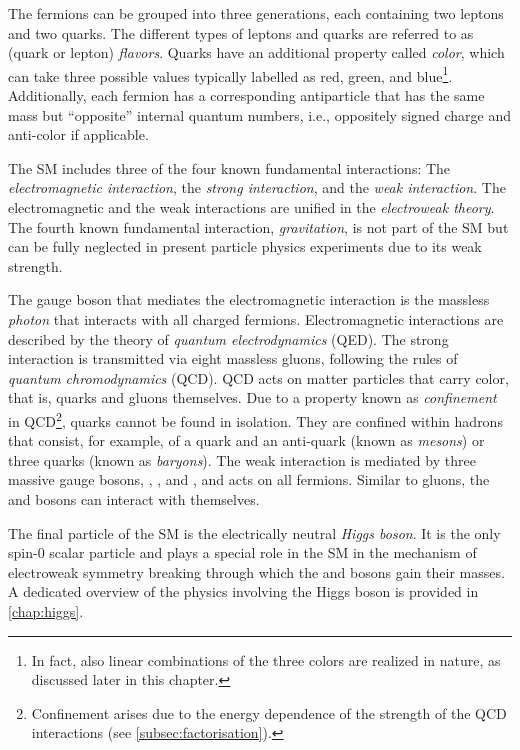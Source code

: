 The fermions can be grouped into three generations, each containing two leptons and two quarks. The different types of leptons and quarks are referred to as (quark or lepton) \emph{flavors}.
Quarks have an additional property called \emph{color}, which can take three possible values typically labelled as red, green, and blue\footnote{In fact, also linear combinations of the three colors are realized in nature, as discussed later in this chapter.}.
Additionally, each fermion has a corresponding antiparticle that has the same mass but ``opposite'' internal quantum numbers, i.e., oppositely signed charge and anti-color if applicable.

The SM includes three of the four known fundamental interactions: The \emph{electromagnetic interaction}, the \emph{strong interaction}, and the \emph{weak interaction}. The electromagnetic and the weak interactions are unified in the \emph{electroweak theory}. The fourth known fundamental interaction, \emph{gravitation}, is not part of the SM but can be fully neglected in present particle physics experiments due to its weak strength.

The gauge boson that mediates the electromagnetic interaction is the massless \emph{photon} that interacts with all charged fermions. Electromagnetic interactions are described by the theory of \emph{quantum electrodynamics} (QED). The strong interaction is transmitted via eight massless gluons, following the rules of \emph{quantum chromodynamics} (QCD). QCD acts on matter particles that carry color, that is, quarks and gluons themselves. 
Due to a property known as \emph{confinement} in QCD\footnote{Confinement arises due to the energy dependence of the strength of the QCD interactions (see \cref{subsec:factorisation}).}, quarks cannot be found in isolation. They are confined within hadrons that consist, for example, of a quark and an anti-quark (known as \emph{mesons}) or three quarks (known as \emph{baryons}).
The weak interaction is mediated by three massive gauge bosons, \Wplus, \Wminus, and \Zboson, and acts on all fermions. Similar to gluons, the \Wpm and \Zboson bosons can interact with themselves.

The final particle of the SM is the electrically neutral \emph{Higgs boson}. It is the only spin-0 scalar particle and plays a special role in the SM in the mechanism of electroweak symmetry breaking through which the \Wpm and \Zboson bosons gain their masses. A dedicated overview of the physics involving the Higgs boson is provided in \cref{chap:higgs}.


